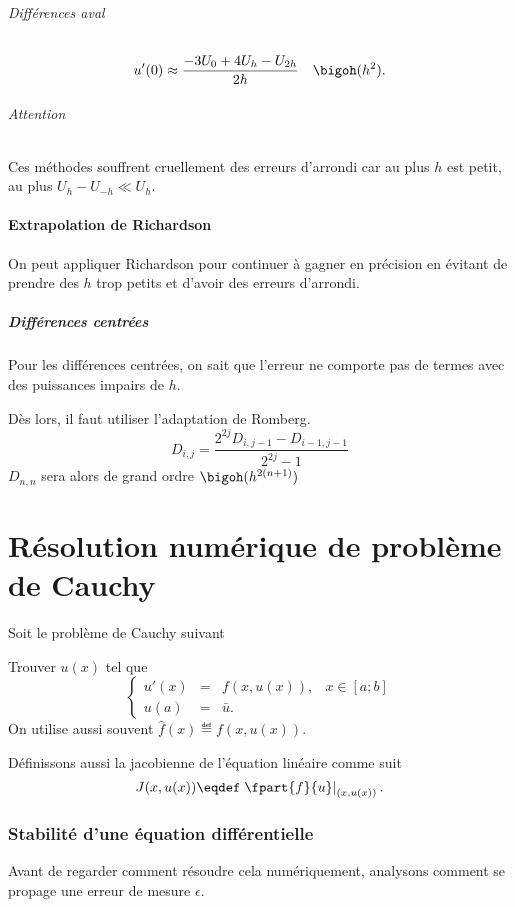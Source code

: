 \paragraph{Différences aval}
\begin{align*}
  u'(0) & \approx \frac{-3U_0 + 4U_{h} - U_{2h}}{2h} & \bigoh(h^2).
\end{align*}

\paragraph{Attention}
Ces méthodes souffrent cruellement des erreurs d'arrondi
car au plus $h$ est petit, au plus $U_h - U_{-h} \ll U_h$.

\subsection{Extrapolation de Richardson}
On peut appliquer Richardson pour continuer à gagner en précision
en évitant de prendre des $h$ trop petits et d'avoir des erreurs d'arrondi.

\subsubsection{Différences centrées}
Pour les différences centrées, on sait que l'erreur ne comporte
pas de termes avec des puissances impairs de $h$.

Dès lors, il faut utiliser l'adaptation de Romberg.
\[ D_{i, j} = \frac{2^{2j}D_{i,j-1} - D_{i-1,j-1}}{2^{2j}-1} \]
$D_{n, n}$ sera alors de grand ordre $\bigoh(h^{2(n+1)})$

\part{Résolution numérique de problème de Cauchy}
Soit le problème de Cauchy suivant

Trouver $u(x)$ tel que
\[ \left\{ \begin{array}{rclr}
    u'(x) & = & f(x,u(x)), & x \in [a;b]\\
    u(a) & = & \bar{u}.
\end{array} \right. \]
On utilise aussi souvent $\hat{f}(x) \eqdef f(x, u(x))$.

Définissons aussi la jacobienne de l'équation linéaire comme suit
\[ J(x, u(x)) \eqdef \left.\fpart{f}{u}\right|_{(x,u(x))}. \]


\section{Stabilité d'une équation différentielle}
Avant de regarder comment résoudre cela numériquement,
analysons comment se propage une erreur de mesure $\epsilon$.

